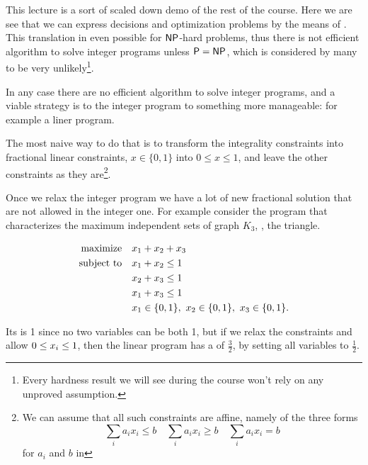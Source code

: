 \documentclass[a4paper,twoside,justified]{tufte-handout}
\begin{document}
 

This lecture is a sort of scaled down demo of the rest of the
course. Here we are see that we can express decisions and optimization
problems by the means of . This translation in
even possible for $ \mathsf{NP} $-hard problems, thus there is not efficient
algorithm to solve integer programs unless $\mathsf{P}=\mathsf{NP}$, which is
considered by many to be very unlikely\footnote{Every hardness result
  we will see during the course won't rely on any unproved assumption.}.

In any case there are no  efficient algorithm to
solve integer programs, and a viable strategy is to
 the integer program to something more
manageable: for example a liner program.

The most naive way to do that is to transform the integrality
constraints into fractional linear constraints, \eg $ x \in\{0,1\} $
into $ 0 \leq x \leq 1 $, and leave the other constraints as they
are\footnote{We can assume that all such constraints are affine,
  namely of the three forms
  \begin{equation*}
    \sum_{i}a_{i}x_{i} \leq b \quad   \sum_{i}a_{i}x_{i} \geq b \quad \sum_{i}a_{i}x_{i} = b
  \end{equation*}
  for $a_i$ and $ b $ in \RR}.

Once we relax the integer program we have a lot of new fractional
solution that are not allowed in the integer one. For example consider
the program that characterizes the maximum independent sets of graph $
K_{3} $, \ie, the triangle.

\begin{alignat}{2}
  \maximize x_{1} + x_{2} + x_{3} \notag\\
  \subjectto   x_{1} + x_{2} \leq 1 \notag\\
             & x_{2} + x_{3} \leq 1 \label{eq:triangle-ind-set}\\
             & x_{1} + x_{3} \leq 1 \notag\\
             & \varboolean{x_{1}},\ \varboolean{x_{2}},\ \varboolean{x_{3}}.\notag
\end{alignat}

Its  is 1 since no two variables can be
both 1, but if we relax the constraints and allow $ \varbounded{x_{i}}
$, then the linear program has a 
of $ \frac{3}{2} $, by setting all variables to $\frac{1}{2}$.
\end{document}
